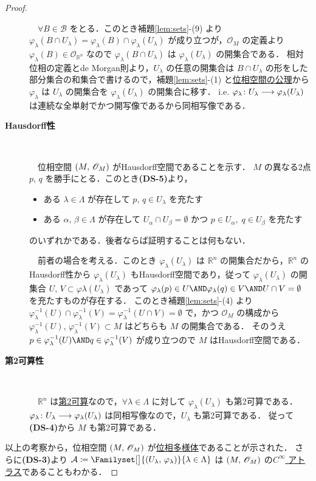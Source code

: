 \documentclass[geometry_main]{subfiles}
\begin{document}
\begin{proof}
\begin{description}
		　$\forall B \in \mathscr{B}$ をとる．このとき補題\ref{lem:sets}-(9) より $\varphi_\lambda(B \cap U_\lambda) = \varphi_\lambda(B) \cap \varphi_\lambda(U_\lambda)$ が成り立つが，$\mathscr{O}_M$ の定義より $\varphi_\lambda(B) \in \mathscr{O}_{\mathbb{R}^n}$ なので $\varphi_\lambda(B \cap U_\lambda)$ は $\varphi_\lambda(U_\lambda)$ の開集合である．
		相対位相の定義とde Morgan則より，$U_\lambda$ の任意の開集合は $B \cap U_\lambda$ の形をした部分集合の和集合で書けるので，補題\ref{lem:sets}-(1) と\hyperref[ax.topo]{位相空間の公理}から $\varphi_\lambda$ は $U_\lambda$ の開集合を $\varphi_\lambda(U_\lambda)$ の開集合に移す．
		i.e. $\varphi_\lambda \colon U_\lambda \longrightarrow \varphi_\lambda(U_\lambda)$ は連続な全単射でかつ開写像であるから同相写像である．

		\item[\textbf{Hausdorff性}]　
		
		　位相空間 $(M,\, \mathscr{O}_{M})$ がHausdorff空間であることを示す．
		$M$ の異なる2点 $p,\, q$ を勝手にとる．このとき\textsf{\textbf{(DS-5)}}より，
		\begin{itemize}
			\item ある $\lambda \in \Lambda$ が存在して $p,\, q \in U_\lambda$ を充たす
			\item ある $\alpha,\, \beta \in \Lambda$ が存在して $U_\alpha \cap U_\beta = \emptyset$ かつ $p \in U_\alpha,\; q \in U_\beta$ を充たす
		\end{itemize}
		のいずれかである．後者ならば証明することは何もない．

		　前者の場合を考える．このとき $\varphi_\lambda(U_\lambda)$ は $\mathbb{R}^n$ の開集合だから，$\mathbb{R}^n$ のHausdorff性から $\varphi_\lambda(U_\lambda)$ もHausdorff空間であり，従って $\varphi_\lambda(U_\lambda)$ の開集合 $U,\, V \subset \varphi\lambda(U_\lambda)$ であって $\varphi_\lambda(p) \in U \AND \varphi_\lambda(q) \in V \AND U \cap V = \emptyset$ を充たすものが存在する．
		このとき補題\ref{lem:sets}-(4) より $\varphi_\lambda^{-1}(U) \cap \varphi_\lambda^{-1}(V) = \varphi^{-1}_\lambda(U\cap V) = \emptyset$ で，かつ $\mathscr{O}_M$ の構成から $\varphi_\lambda^{-1}(U),\, \varphi_\lambda^{-1}(V) \subset M$ はどちらも $M$ の開集合である．
		そのうえ $p \in \varphi_\lambda^{-1}(U) \AND q \in \varphi_\lambda^{-1}(V)$ が成り立つので $M$ はHausdorff空間である．

		\item[\textbf{第2可算性}]　
		
		　$\mathbb{R}^n$ は\hyperref[def:second-countable]{第2可算}なので，$\forall \lambda \in \Lambda$ に対して $\varphi_\lambda(U_\lambda)$ も第2可算である．$\varphi_\lambda \colon U_\lambda \longrightarrow \varphi_\lambda (U_\lambda)$ は同相写像なので，$U_\lambda$ も第2可算である．
		従って\textsf{\textbf{(DS-4)}}から $M$ も第2可算である．
	\end{description}
	以上の考察から，位相空間 $(M,\, \mathscr{O}_{M})$ が\hyperref[def.topomani]{位相多様体}であることが示された．
	さらに\textsf{\textbf{(DS-3)}}より $\mathcal{A} \coloneqq \Familyset[\big]{(U_\lambda,\, \varphi_\lambda)}{\lambda \in \Lambda}$ は $(M,\, \mathscr{O}_{M})$ の\hyperref[diffmani]{$C^\infty$ アトラス}であることもわかる．


\end{proof}
\end{document}
